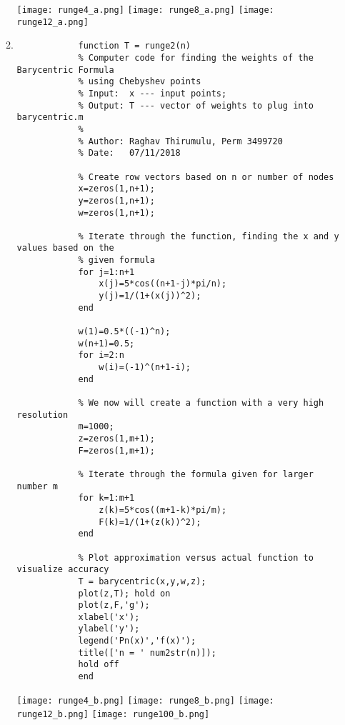 \documentclass{article}
\begin{document}
\begin{enumerate}
\begin{enumerate}
\begin{lstlisting}
            \end{lstlisting}
            
            \begin{center}
                    \texttt{[image: runge4\_a.png]}
                    \texttt{[image: runge8\_a.png]}
                    \texttt{[image: runge12\_a.png]}
            \end{center}
            
            \item
            \begin{lstlisting}
            function T = runge2(n)
            % Computer code for finding the weights of the Barycentric Formula
            % using Chebyshev points
            % Input:  x --- input points;
            % Output: T --- vector of weights to plug into barycentric.m
            %
            % Author: Raghav Thirumulu, Perm 3499720
            % Date:   07/11/2018

            % Create row vectors based on n or number of nodes
            x=zeros(1,n+1);
            y=zeros(1,n+1);
            w=zeros(1,n+1);

            % Iterate through the function, finding the x and y values based on the
            % given formula
            for j=1:n+1
                x(j)=5*cos((n+1-j)*pi/n);
                y(j)=1/(1+(x(j))^2);
            end

            w(1)=0.5*((-1)^n);
            w(n+1)=0.5;
            for i=2:n
                w(i)=(-1)^(n+1-i);
            end

            % We now will create a function with a very high resolution
            m=1000;
            z=zeros(1,m+1);
            F=zeros(1,m+1);

            % Iterate through the formula given for larger number m
            for k=1:m+1
                z(k)=5*cos((m+1-k)*pi/m);
                F(k)=1/(1+(z(k))^2);
            end

            % Plot approximation versus actual function to visualize accuracy
            T = barycentric(x,y,w,z);
            plot(z,T); hold on
            plot(z,F,'g');
            xlabel('x');
            ylabel('y');
            legend('Pn(x)','f(x)');
            title(['n = ' num2str(n)]);
            hold off
            end
            \end{lstlisting}
            
            \begin{center}
            \texttt{[image: runge4\_b.png]}
            \texttt{[image: runge8\_b.png]}
            \texttt{[image: runge12\_b.png]}
            \texttt{[image: runge100\_b.png]}
            \end{center}
            

\end{enumerate}
\end{enumerate}
\end{document}
